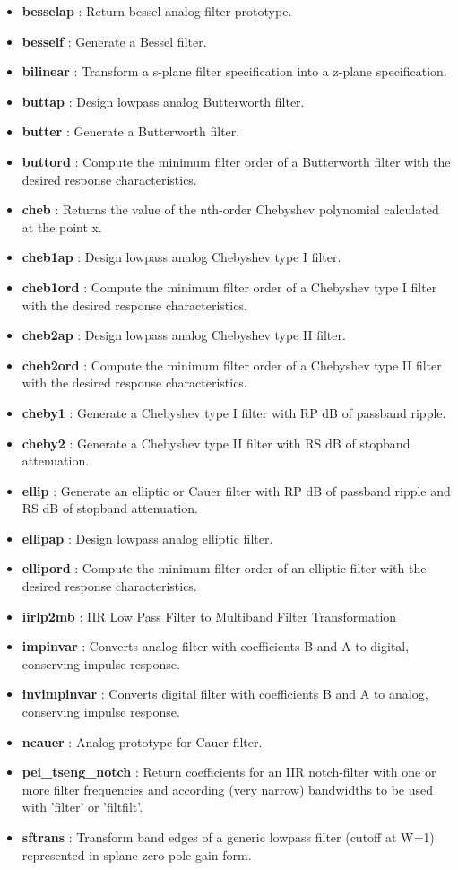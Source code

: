 \documentclass[12pt]{article}
\begin{document}
\begin{itemize}
    \item {\bfseries besselap} : Return bessel analog filter prototype.
    \item {\bfseries besself} : Generate a Bessel filter.
    \item {\bfseries bilinear} : Transform a s-plane filter specification into a z-plane specification.
    \item {\bfseries buttap} : Design lowpass analog Butterworth filter.
    \item {\bfseries butter} : Generate a Butterworth filter.
    \item {\bfseries buttord} : Compute the minimum filter order of a Butterworth filter with the desired response characteristics.
    \item {\bfseries cheb} : Returns the value of the nth-order Chebyshev polynomial calculated at the point x.
    \item {\bfseries cheb1ap} : Design lowpass analog Chebyshev type I filter.
    \item {\bfseries cheb1ord} : Compute the minimum filter order of a Chebyshev type I filter with the desired response characteristics.
    \item {\bfseries cheb2ap} : Design lowpass analog Chebyshev type II filter.
    \item {\bfseries cheb2ord} : Compute the minimum filter order of a Chebyshev type II filter with the desired response characteristics.
    \item {\bfseries cheby1} : Generate a Chebyshev type I filter with RP dB of passband ripple.
    \item {\bfseries cheby2} : Generate a Chebyshev type II filter with RS dB of stopband attenuation.
    \item {\bfseries ellip} : Generate an elliptic or Cauer filter with RP dB of passband ripple and RS dB of stopband attenuation.
    \item {\bfseries ellipap} : Design lowpass analog elliptic filter.
    \item {\bfseries ellipord} : Compute the minimum filter order of an elliptic filter with the desired response characteristics.
    \item {\bfseries iirlp2mb} : IIR Low Pass Filter to Multiband Filter Transformation
    \item {\bfseries impinvar} : Converts analog filter with coefficients B and A to digital, conserving impulse response.
    \item {\bfseries invimpinvar} : Converts digital filter with coefficients B and A to analog, conserving impulse response.
    \item {\bfseries ncauer} : Analog prototype for Cauer filter.
    \item {\bfseries pei\_tseng\_notch} : Return coefficients for an IIR notch-filter with one or more filter frequencies and according (very narrow) bandwidths to be used with 'filter' or 'filtfilt'.
    \item {\bfseries sftrans} : Transform band edges of a generic lowpass filter (cutoff at W=1) represented in splane zero-pole-gain form.


\end{itemize}
\end{document}
